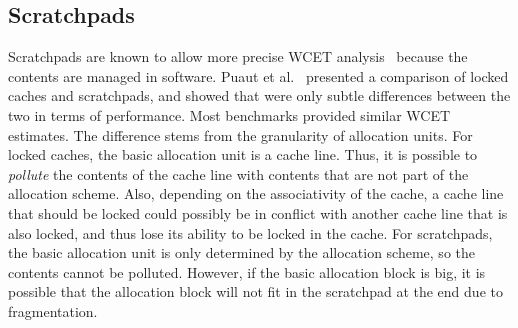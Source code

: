 \subsection{Scratchpads}
Scratchpads are known to allow more precise WCET analysis~\cite{Wehmeyer2005SPM} because the contents are managed in software. 
Puaut et al.~\cite{Puaut2007SPMvsCache} presented a comparison of locked caches and scratchpads, and showed that were only subtle differences between the two in terms of performance. 
Most benchmarks provided similar WCET estimates. 
The difference stems from the granularity of allocation units. 
For locked caches, the basic allocation unit is a cache line. 
Thus, it is possible to \emph{pollute} the contents of the cache line with contents that are not part of the allocation scheme. 
Also, depending on the associativity of the cache, a cache line that should be locked could possibly be in conflict with another cache line that is also locked, and thus lose its ability to be locked in the cache. 
For scratchpads, the basic allocation unit is only determined by the allocation scheme, so the contents cannot be polluted. 
However, if the basic allocation block is big, it is possible that the allocation block will not fit in the scratchpad at the end due to fragmentation.  
 
% 
% 

